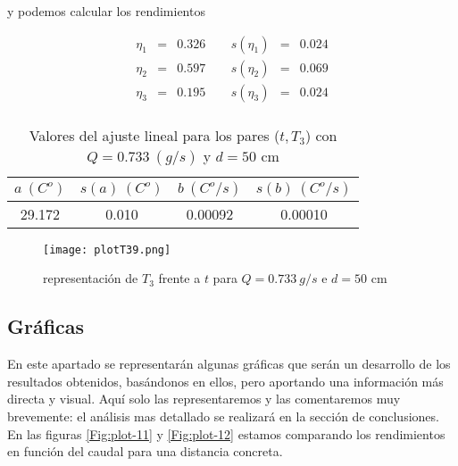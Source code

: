 \documentclass[12pt,a4paper]{article}
\begin{document}
 y podemos calcular los rendimientos 
 
\begin{equation} 
\begin{array}{lllllll}
\eta_1 & = & 0.326  &  \ \ &  s(\eta_1) & =  & 0.024   \\ 
 \eta_2 & = & 0.597  &  \ \ &  s(\eta_2) & =  & 0.069   \\ 
 \eta_3 & = & 0.195  &  \ \ &  s(\eta_3) & =  & 0.024   \\ 
 \end{array} 
\end{equation} 
 
 \begin{table}[h!] 	 \centering 
\begin{tabular}{|c|c|c|c|} 
\hline 
$a \ (C^o)$ & $s(a) \ (C^o)$ & $ b \ (C^o/s)$ & $s(b) \ (C^o/s)$  \\ \hline 
29.172  & 0.010 &  0.00092 & 0.00010\\ 
\hline
\end{tabular} 
\caption{Valores del ajuste lineal para los pares ($t,T_3$) con $Q=0.733 \ (g/s)$ y $d= 50 $ cm} 
\label{tab:regresion10} 
\end{table} 
 
 
\begin{figure}[h!] 	 \centering 
\texttt{[image: plotT39.png]} 
\caption{representación de $T_3$ frente a $t$ para $Q = 0.733 \ g/s$ e $d = 50$ cm} 
\label{Fig:plot-10}  
\end{figure} 
 
\newpage 
 
 
 
 
 
\newpage 
 
\subsection{Gráficas} \label{subsec:graficas}

En este apartado se representarán algunas gráficas que serán un desarrollo de los resultados obtenidos, basándonos en ellos, pero aportando una información más directa y visual. Aquí solo las representaremos y las comentaremos muy brevemente: el análisis mas detallado se realizará en la sección de conclusiones.  \\

En las figuras \ref{Fig:plot-11} y \ref{Fig:plot-12} estamos comparando los rendimientos en función del caudal para una distancia concreta. \\
\end{document}
